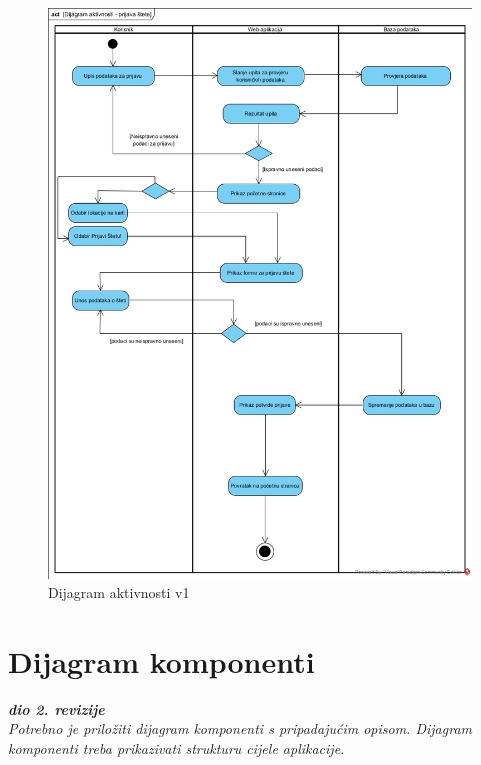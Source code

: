 \begin{figure}[H]
	\includegraphics[scale=0.5]{slike/DA.jpg} %
	\centering
	\caption{Dijagram aktivnosti v1}
	\label{fig:DijagramAktivnosti}
\end{figure}

\eject
\section{Dijagram komponenti}

\textbf{\textit{dio 2. revizije}}\\

\textit{Potrebno je priložiti dijagram komponenti s pripadajućim opisom. Dijagram komponenti treba prikazivati strukturu cijele aplikacije.}

